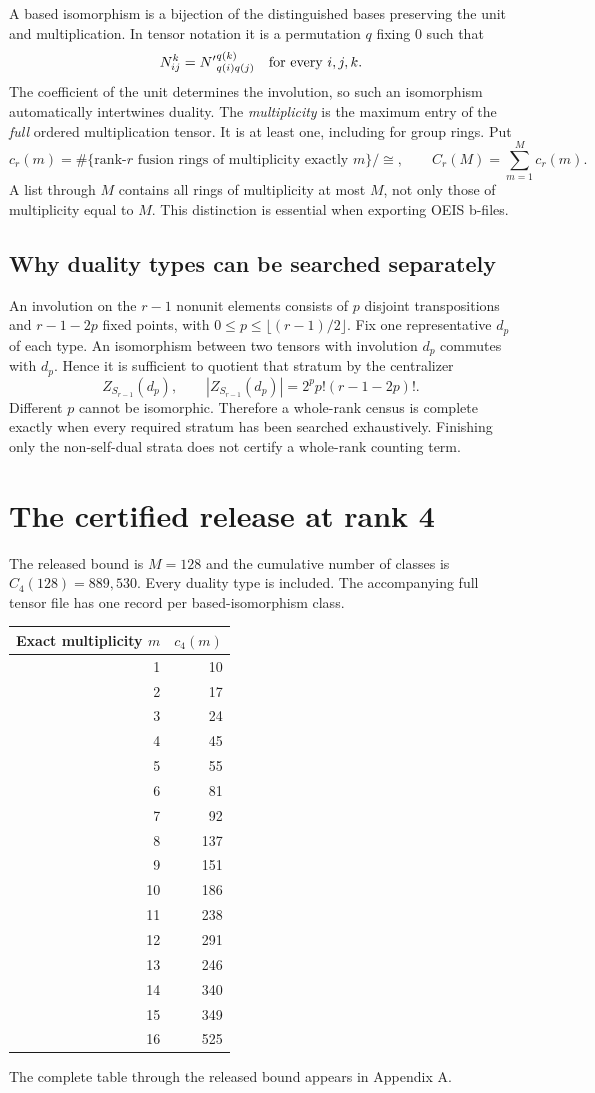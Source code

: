 \documentclass[11pt,a4paper]{article}
\theoremstyle{definition}\newtheorem{definition}[theorem]{Definition}\newtheorem{remark}[theorem]{Remark}
\newcommand{\Rank}{4}
\begin{document}
A based isomorphism is a bijection of the distinguished bases preserving the
unit and multiplication. In tensor notation it is a permutation $q$ fixing $0$
such that
\[
 N_{ij}^{k}={N'}_{q(i)q(j)}^{q(k)}\quad\hbox{for every }i,j,k.
\]
The coefficient of the unit determines the involution, so such an isomorphism
automatically intertwines duality. The \emph{multiplicity} is the maximum entry
of the \emph{full} ordered multiplication tensor. It is at least one, including
for group rings. Put
\[
 c_r(m)=\#\{\text{rank-}r\text{ fusion rings of multiplicity exactly }m\}/\cong,
 \qquad C_r(M)=\sum_{m=1}^{M}c_r(m).
\]
A list through $M$ contains all rings of multiplicity at most $M$, not only
those of multiplicity equal to $M$. This distinction is essential when exporting
OEIS b-files.

\subsection{Why duality types can be searched separately}
An involution on the $r-1$ nonunit elements consists of $p$ disjoint transpositions
and $r-1-2p$ fixed points, with $0\leq p\leq\lfloor(r-1)/2\rfloor$. Fix one
representative $d_p$ of each type. An isomorphism between two tensors with
involution $d_p$ commutes with $d_p$. Hence it is sufficient to quotient that
stratum by the centralizer
\[
 Z_{S_{r-1}}(d_p),\qquad |Z_{S_{r-1}}(d_p)|=2^p p!(r-1-2p)!.
\]
Different $p$ cannot be isomorphic. Therefore a whole-rank census is complete
exactly when every required stratum has been searched exhaustively. Finishing
only the non-self-dual strata does not certify a whole-rank counting term.
\section{The certified release at rank 4}
The released bound is $M=128$ and the cumulative number of classes is $C_{4}(128)=889,530$. Every duality type is included. The accompanying full tensor file has one record per based-isomorphism class.


\begin{center}\begin{tabular}{rr}\toprule Exact multiplicity $m$ & $c_{\Rank}(m)$\\\midrule
1 & 10\\
2 & 17\\
3 & 24\\
4 & 45\\
5 & 55\\
6 & 81\\
7 & 92\\
8 & 137\\
9 & 151\\
10 & 186\\
11 & 238\\
12 & 291\\
13 & 246\\
14 & 340\\
15 & 349\\
16 & 525\\
\bottomrule\end{tabular}\end{center}
The complete table through the released bound appears in Appendix A.
\end{document}
